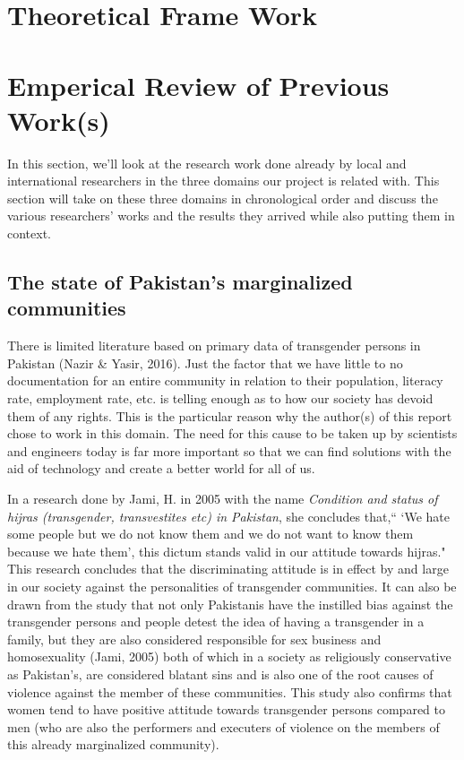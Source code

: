 \section{Theoretical Frame Work}

\section{Emperical Review of Previous Work(s)}

In this section, we'll look at the research work done already by local and international researchers in the three domains our project is related with. This section will take on these three domains in chronological order and discuss the various researchers' works  and the results they arrived while also putting them in context.

\subsection{The state of Pakistan's marginalized communities}

There is limited literature based on primary data of transgender persons in Pakistan (Nazir \& Yasir, 2016). Just the factor that we have little to no documentation for an entire community in relation to their population, literacy rate, employment rate, etc. is telling enough as to how our society has devoid them of any rights. This is the particular reason why the author(s) of this report chose to work in this domain. The need for this cause to be taken up by scientists and engineers today is far more important so that we can find solutions with the aid of technology and create a better world for all of us. 

In a research done by Jami, H. in 2005 with the name \textit {Condition and status of hijras (transgender, transvestites etc) in Pakistan}, she concludes that,“ `We hate some people but we do not know them and we do not want to know them because we hate them', this dictum stands valid in our attitude towards hijras." This research concludes that the discriminating attitude is in effect by and large in our society against the personalities of transgender communities. It can also be drawn from the study that not only Pakistanis have the instilled bias against the transgender persons and people detest the idea of having a transgender in a family, but they are also considered responsible for sex business and homosexuality (Jami, 2005) both of which in a society as religiously conservative as Pakistan's, are considered blatant sins and is also one of the root causes of violence against the member of these communities. This study also confirms that women tend to have positive attitude towards transgender persons compared to men (who are also the performers and executers of violence on the members of this already marginalized community). 

